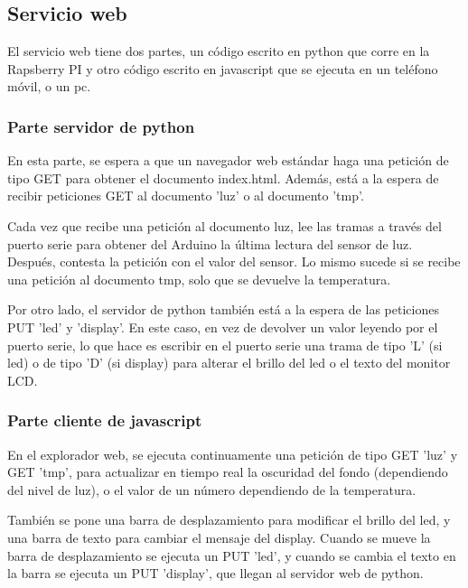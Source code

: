 \documentclass[]{article}
\begin{document}
\subsection{Servicio web}
El servicio web tiene dos partes, un código escrito en python que corre en la Rapsberry PI y otro código escrito en javascript que se ejecuta en un teléfono móvil, o un pc.

\subsubsection{Parte servidor de python}
En esta parte, se espera a que un navegador web estándar haga una petición de tipo GET para obtener el documento index.html. Además, está a la espera de recibir peticiones GET al documento 'luz' o al documento 'tmp'.

\hfill

Cada vez que recibe una petición al documento luz, lee las tramas a través del puerto serie para obtener del Arduino la última lectura del sensor de luz. Después, contesta la petición con el valor del sensor. Lo mismo sucede si se recibe una petición al documento tmp, solo que se devuelve la temperatura.

\hfill

Por otro lado, el servidor de python también está a la espera de las peticiones PUT 'led' y 'display'. En este caso, en vez de devolver un valor leyendo por el puerto serie, lo que hace es escribir en el puerto serie una trama de tipo 'L' (si led) o de tipo 'D' (si display) para alterar el brillo del led o el texto del monitor LCD.

\subsubsection{Parte cliente de javascript}

En el explorador web, se ejecuta continuamente una petición de tipo GET 'luz' y GET 'tmp', para actualizar en tiempo real la oscuridad del fondo (dependiendo del nivel de luz), o el valor de un número dependiendo de la temperatura.

\hfill

También se pone una barra de desplazamiento para modificar el brillo del led, y una barra de texto para cambiar el mensaje del display. Cuando se mueve la barra de desplazamiento se ejecuta un PUT 'led', y cuando se cambia el texto en la barra se ejecuta un PUT 'display', que llegan al servidor web de python.


\end{document}
